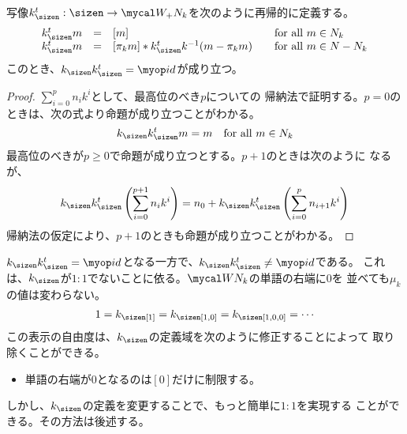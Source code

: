 	\begin{proposition}[k進数表示のエンコード]
	\label{prop:k進数表示のエンコード} %
		写像$k_\sizen^t:\sizen\to\Word_+ N_k$を次のように再帰的に定義する。
		{\setlength\arraycolsep{1pt}
		\begin{equation*}\begin{array}{rcll}
			k_\sizen^t m &=& [m] &\quad\text{for all } m\in N_k \\
			k_\sizen^t m &=& [\pi_km] * k_\sizen^tk^{-1}(m - \pi_km)
			&\quad\text{for all } m\in N - N_k \\
		\end{array}\end{equation*}
		}
		このとき、$k_\sizen k_\sizen^t = \id$が成り立つ。
	\end{proposition} %
	\begin{proof} $\sum_{i=0}^pn_ik^i$として、最高位のべき$p$についての
	帰納法で証明する。$p=0$のときは、次の式より命題が成り立つことがわかる。
	\begin{equation*}\begin{split}
		k_\sizen k_\sizen^t m = m \quad\text{for all } m\in N_k
	\end{split}\end{equation*}
	最高位のべきが$p\ge0$で命題が成り立つとする。$p+1$のときは次のように
	なるが、
	\begin{equation*}\begin{split}
		k_\sizen k_\sizen^t \left(\sum_{i=0}^{p+1}n_ik^i\right)
		= n_0 + k_\sizen k_\sizen^t \left(\sum_{i=0}^pn_{i+1}k^i\right)
	\end{split}\end{equation*}
	帰納法の仮定により、$p+1$のときも命題が成り立つことがわかる。
	\end{proof}

	$k_\sizen k_\sizen^t=\id$となる一方で、$k_\sizen k^t_\sizen\neq\id$である。
	これは、$k_\sizen$が$1:1$でないことに依る。$\Word N_k$の単語の右端に$0$を
	並べても$\mu_k$の値は変わらない。
	\begin{equation*}\begin{split}
		1 = k_\sizen[1] = k_\sizen[1,0] = k_\sizen[1,0,0] = \cdots
	\end{split}\end{equation*}
	この表示の自由度は、$k_\sizen$の定義域を次のように修正することによって
	取り除くことができる。
	\begin{itemize}\setlength{\itemsep}{-1mm} %
		\item 単語の右端が$0$となるのは$[0]$だけに制限する。
	\end{itemize} %
	しかし、$k_\sizen$の定義を変更することで、もっと簡単に$1:1$を実現する
	ことができる。その方法は後述する。

